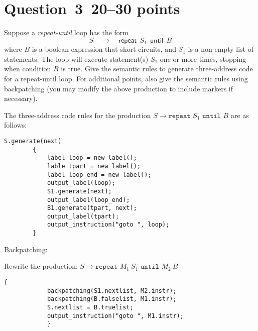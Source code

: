 \documentclass[10pt]{article}
\begin{document}
\section*{Question~3~\hfill 20--30 points}
Suppose a \emph{repeat-until} loop
has the form
\[
  S \quad \rightarrow \quad \mathsf{repeat} ~~ S_1 ~~\mathsf{until} ~~ B
\]
where $B$ is a boolean expression that short circuits,
and $S_1$ is a non-empty list of statements.
The loop will execute statement(s) $S_1$ one or more times,
stopping when condition $B$ is true.
Give the semantic rules to generate three-address code for a repeat-until loop.
For additional points, also give the semantic rules using backpatching
(you may modify the above production to include markers if necessary).
\begin{framed}
The three-address code rules for the production $S \rightarrow \texttt{repeat } S_1 \texttt{ until } B$ are as follows:


\begin{lstlisting}[style=jvm]
        S.generate(next)
        {
            label loop = new label();
            lable tpart = new label();
            label loop_end = new label();
            output_label(loop);
            S1.generate(next);
            output_label(loop_end);
            B1.generate(tpart, next);
            output_label(tpart);
            output_instruction("goto ", loop);
        }
\end{lstlisting}
\end{framed}

\begin{framed}
Backpatching:

Rewrite the production: $ S \rightarrow \texttt{repeat } M_1 \ S_1 \texttt{ until } M_2 \  B $

\begin{lstlisting}[style=jvm]
            {
            backpatching(S1.nextlist, M2.instr);
            backpatching(B.falselist, M1.instr);
            S.nextlist = B.truelist;
            output_instruction("goto ", M1.instr);
            }
\end{lstlisting}
\end{framed}
\end{document}
